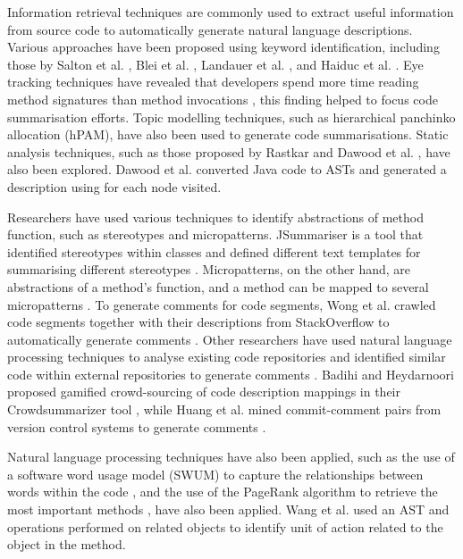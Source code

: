 \documentclass{l4proj}
\begin{document}
Information retrieval techniques are commonly used to extract useful information from source code to automatically generate natural language descriptions. Various approaches have been proposed using keyword identification, including those by Salton et al. \cite{salton1975vector}, Blei et al. \cite{blei2003latent}, Landauer et al. \cite{landauer1998introduction}, and Haiduc et al. \cite{haiduc2010supporting}. Eye tracking techniques have revealed that developers spend more time reading method signatures than method invocations \cite{rodeghero2014improving}, this finding helped to focus code summarisation efforts. Topic modelling techniques, such as hierarchical panchinko allocation (hPAM)\cite{mimno2007mixtures}, have also been used to generate code summarisations. Static analysis techniques, such as those proposed by Rastkar \cite{rastkar2010summarizing} and Dawood et al. \cite{dawood2017source}, have also been explored. Dawood et al. converted Java code to ASTs and generated a description using for each node visited. 

Researchers have used various techniques to identify abstractions of method function, such as stereotypes and micropatterns. JSummariser is a tool that identified stereotypes within classes and defined different text templates for summarising different stereotypes \cite{moreno2013automatic,abid2015using}. Micropatterns, on the other hand, are abstractions of a method's function, and a method can be mapped to several micropatterns \cite{malhotra2018class,rai2017method}. To generate comments for code segments, Wong et al. crawled code segments together with their descriptions from StackOverflow to automatically generate comments \cite{wong2013autocomment}. Other researchers have used natural language processing techniques to analyse existing code repositories and identified similar code within external repositories to generate comments \cite{wong2015clocom}. Badihi and Heydarnoori proposed gamified crowd-sourcing of code description mappings in their Crowdsummarizer tool \cite{badihi2017crowdsummarizer}, while Huang et al. mined commit-comment pairs from version control systems to generate comments \cite{huang2017mining}.

Natural language processing techniques have also been applied, such as the use of a software word usage model (SWUM) to capture the relationships between words within the code \cite{xia2017measuring}, and the use of the PageRank algorithm to retrieve the most important methods \cite{mcburney2014automatic}, have also been applied. Wang et al. \cite{wang2017automatically} used an AST and operations performed on related objects to identify unit of action related to the object in the method.
\end{document}
